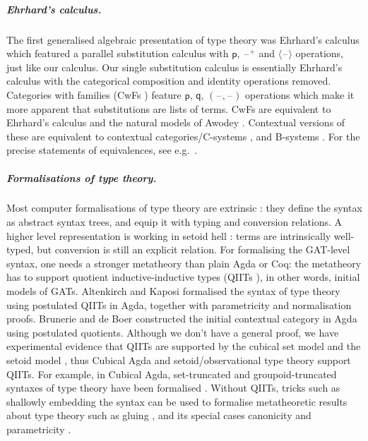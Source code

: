\documentclass[submission,copyright,creativecommons]{eptcs}
\newcommand{\p}{\mathsf{p}}
\newcommand{\q}{\mathsf{q}}
\newcommand{\blank}{\mathord{\hspace{1pt}\text{--}\hspace{1pt}}} %
\begin{document}
\vspace{-1em}
\subparagraph*{Ehrhard's calculus.}
The first generalised algebraic presentation of type theory was
Ehrhard's calculus \cite{ehrhard,coquandEhrhard} which featured a
parallel substitution calculus with $\p$, $\blank^+$ and
$\langle\blank\rangle$ operations, just like our calculus. Our
single substitution calculus is essentially Ehrhard's calculus with
the categorical composition and identity operations
removed. Categories with families (CwFs
\cite{DBLP:conf/types/Dybjer95,Castellan2021}) feature $\p$, $\q$,
$(\blank,\blank)$ operations which make it more apparent that
substitutions are lists of terms. CwFs are equivalent to Ehrhard's
calculus and the natural models of Awodey \cite{DBLP:journals/mscs/Awodey18}. Contextual versions of these are equivalent to contextual categories/C-systems
\cite{DBLP:journals/apal/Cartmell86,DBLP:journals/lmcs/AhrensLV18}, and
B-systems \cite{bc}. For the precise statements of equivalences, see e.g.\ \cite{DBLP:conf/aplas/AhrensLN24}.

\vspace{-1em}
\subparagraph*{Formalisations of type theory.}
Most computer formalisations of type theory are extrinsic
\cite{DBLP:journals/pacmpl/0001OV18,DBLP:conf/cpp/AdjedjLMPP24,DBLP:journals/jar/SozeauABCFKMTW20}:
they define the syntax as abstract syntax trees, and equip it with
typing and conversion relations. A higher level representation is
working in setoid hell \cite{chapman09eatitself,setoidhell}: terms are
intrinsically well-typed, but conversion is still an explicit
relation. For formalising the GAT-level syntax, one needs a stronger
metatheory than plain Agda or Coq: the metatheory has to support
quotient inductive-inductive types (QIITs
\cite{DBLP:journals/pacmpl/KaposiKA19}), in other words, initial
models of GATs. Altenkirch and Kaposi
\cite{DBLP:conf/popl/AltenkirchK16} formalised the syntax of type
theory using postulated QIITs in Agda, together with parametricity and
normalisation \cite{lmcs:4005} proofs. Brunerie and de Boer
\cite{initiality-agda} constructed the initial contextual category in
Agda using postulated quotients. Although we don't have a general
proof, we have experimental evidence that QIITs are supported by the
cubical set model \cite{DBLP:conf/lics/CoquandHM18} and the setoid
model \cite{kaposi-qiit-setoid}, thus Cubical Agda
\cite{DBLP:journals/jfp/VezzosiMA21} and setoid/observational type
theory \cite{setoid,DBLP:phd/hal/Pujet22} support QIITs. For example,
in Cubical Agda, set-truncated and groupoid-truncated syntaxes of type
theory have been formalised \cite{cohtt}. Without QIITs, tricks such
as shallowly embedding the syntax can be used to formalise metatheoretic
results about type theory such as gluing
\cite{glue}, and its special cases
canonicity and parametricity \cite{kaposi-shallow}.
\end{document}

